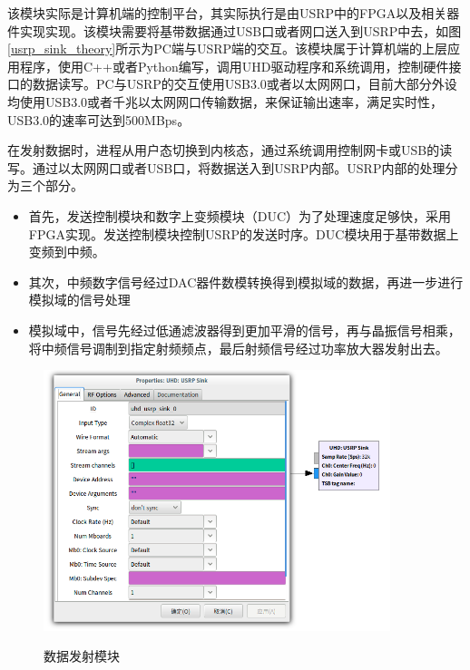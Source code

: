 \documentclass[master]{seuthesis} %
\begin{document}
\begin{Main}
该模块实际是计算机端的控制平台，其实际执行是由USRP中的FPGA以及相关器件实现实现。该模块需要将基带数据通过USB口或者网口送入到USRP中去，如图\ref{usrp_sink_theory}所示为PC端与USRP端的交互。该模块属于计算机端的上层应用程序，使用C++或者Python编写，调用UHD驱动程序和系统调用，控制硬件接口的数据读写。PC与USRP的交互使用USB3.0或者以太网网口，目前大部分外设均使用USB3.0或者千兆以太网网口传输数据，来保证输出速率，满足实时性，USB3.0的速率可达到500MBps\cite{wei2016software}。

在发射数据时，进程从用户态切换到内核态，通过系统调用控制网卡或USB的读写。通过以太网网口或者USB口，将数据送入到USRP内部。USRP内部的处理分为三个部分。

\begin{itemize}
    \item 首先，发送控制模块和数字上变频模块（DUC）为了处理速度足够快，采用FPGA实现。发送控制模块控制USRP的发送时序。DUC模块用于基带数据上变频到中频\cite{xiong2015open}。
    \item 其次，中频数字信号经过DAC器件数模转换得到模拟域的数据，再进一步进行模拟域的信号处理
    \item 模拟域中，信号先经过低通滤波器得到更加平滑的信号，再与晶振信号相乘，将中频信号调制到指定射频频点，最后射频信号经过功率放大器发射出去。
\end{itemize}


\begin{figure}
    \centering
    \includegraphics[width=0.9\textwidth]{images/usrp_sink}
    \caption{数据发射模块}{} 
    \label{usrp_sink}
\end{figure}


\end{Main}
\end{document}
